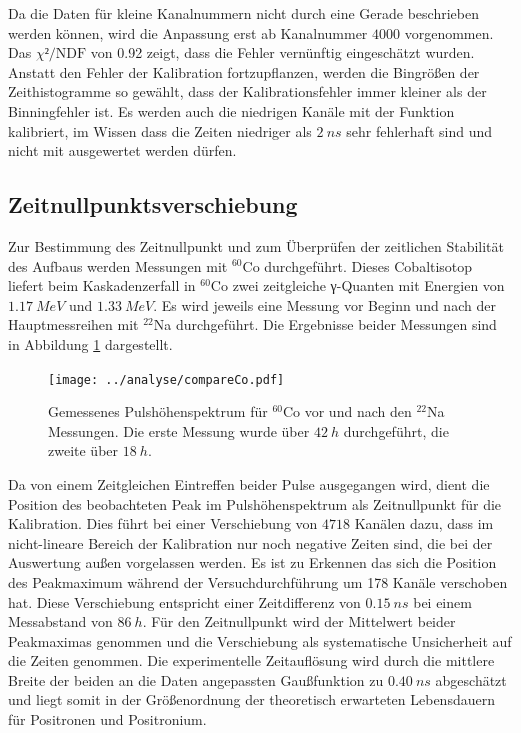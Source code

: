 \documentclass[a4paper,12pt]{article}
\begin{document}
Da die Daten für kleine Kanalnummern nicht durch eine Gerade beschrieben werden können, wird die
Anpassung erst ab Kanalnummer $4000$ vorgenommen.
Das $χ²/\text{NDF}$ von 0.92  zeigt, dass die Fehler vernünftig eingeschätzt wurden.
Anstatt den Fehler der Kalibration fortzupflanzen, werden die Bingrößen der Zeithistogramme so
gewählt, dass der Kalibrationsfehler immer kleiner als der Binningfehler ist.
Es werden auch die niedrigen Kanäle mit der Funktion kalibriert, im Wissen dass die Zeiten niedriger
als $\SI{2}{ns}$ sehr fehlerhaft sind und nicht mit ausgewertet werden dürfen.

\FloatBarrier
\subsection{Zeitnullpunktsverschiebung}\label{cap:zeitverschiebung}

Zur Bestimmung des Zeitnullpunkt und zum Überprüfen der zeitlichen Stabilität des Aufbaus werden Messungen mit
$^{60}$Co durchgeführt.
Dieses Cobaltisotop liefert beim Kaskadenzerfall in $^{60}$Co zwei zeitgleiche γ-Quanten mit Energien von $\SI{1.17}{MeV}$ und $\SI{1.33}{MeV}$. Es wird jeweils eine Messung vor Beginn
und nach der Hauptmessreihen mit $^{22}$Na durchgeführt. Die Ergebnisse beider Messungen sind in Abbildung \ref{fig:compare_co} dargestellt.

\begin{figure}
	\texttt{[image: ../analyse/compareCo.pdf]}
	\caption{Gemessenes Pulshöhenspektrum für $^{60}$Co vor und nach den $^{22}$Na Messungen. Die
	erste Messung wurde über $\SI{42}{h}$ durchgeführt, die zweite über $\SI{18}{h}$.}
	\label{fig:compare_co}
\end{figure}

Da von einem Zeitgleichen Eintreffen beider Pulse ausgegangen wird, dient die Position des
beobachteten Peak im Pulshöhenspektrum als Zeitnullpunkt für die Kalibration.
Dies führt bei einer Verschiebung von $4718$ Kanälen dazu, dass im nicht-lineare Bereich der
Kalibration nur noch negative Zeiten sind, die bei der Auswertung außen vorgelassen werden.
Es ist zu Erkennen das sich die Position des Peakmaximum während der Versuchdurchführung um 178 Kanäle verschoben hat. Diese Verschiebung entspricht einer
Zeitdifferenz von $\SI{0.15}{ns}$ bei einem Messabstand von $\SI{86}{h}$.
Für den Zeitnullpunkt wird der Mittelwert beider Peakmaximas genommen und die Verschiebung als
systematische Unsicherheit auf die Zeiten genommen.
Die experimentelle Zeitauflösung wird durch die mittlere Breite der beiden an die
Daten angepassten Gaußfunktion zu $\SI{0.40}{ns}$ abgeschätzt und liegt somit in der Größenordnung der theoretisch erwarteten Lebensdauern für Positronen und Positronium.
\end{document}
